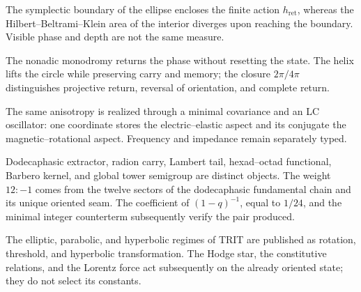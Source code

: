\begin{exactbox}[title={Symplectic finiteness of the boundary and divergence of the interior hyperbolic area}]
The symplectic boundary of the ellipse encloses the finite action
\(h_{\mathrm{ret}}\), whereas the Hilbert--Beltrami--Klein area of the interior
diverges upon reaching the boundary. Visible phase and depth are not the same
measure.
\end{exactbox}

\begin{exactbox}[title={Nonadic Helical Lift with Phase Return and Memory Advance}]
The nonadic monodromy returns the phase without resetting the state. The helix
lifts the circle while preserving carry and memory; the closure \(2\pi/4\pi\)
distinguishes projective return, reversal of orientation, and complete return.
\end{exactbox}

\begin{narrativebox}[title={Oscillatory and constitutive electromagnetic realization}]
The same anisotropy is realized through a minimal covariance and an LC oscillator:
one coordinate stores the electric--elastic aspect and its conjugate the
magnetic--rotational aspect. Frequency and impedance remain separately typed.
\end{narrativebox}

\begin{exactbox}[title={Typed separation of the operators \(90/120\)}]
Dodecaphasic extractor, radion carry, Lambert tail, hexad--octad
functional, Barbero kernel, and global tower semigroup are distinct
objects. The weight \(12:-1\) comes from the twelve sectors of the
dodecaphasic fundamental chain and its unique oriented seam. The coefficient of
\((1-q)^{-1}\), equal to \(1/24\), and the minimal integer counterterm subsequently verify
the pair produced.
\end{exactbox}

\begin{narrativebox}[title={Complex, Lorentzian, and Hodge-dual realizations}]
The elliptic, parabolic, and hyperbolic regimes of TRIT are published as
rotation, threshold, and hyperbolic transformation. The Hodge star, the constitutive relations, and the Lorentz
force act subsequently on the already oriented state; they do not select its
constants.
\end{narrativebox}

